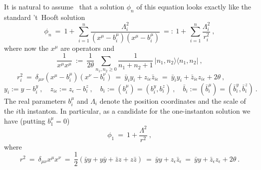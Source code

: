 \documentclass[a4paper,11pt]{article}
\numberwithin{equation}{section}
\def\de{\delta}
\def\eps{\epsilon}
\def\th{\theta}
\def\sfrac#1#2{{\textstyle\frac{#1}{#2}}}
\def\>{\rangle}
\def\<{\langle}
\begin{document}
{It is natural to assume~\cite{Nekrasov:1998ss} that a solution $\phi_n$ of 
this equation looks exactly like the standard 't~Hooft solution 
\begin{equation}\label{phin}
\phi_n\ =\ 1 +\,\sum^n_{i=1}\frac{\Lambda^2_i}{(x^\mu-b_i^\mu)(x^\mu-b_i^\mu)}\
=:\ 1+\,\sum_{i=1}^n\frac{\Lambda^2_i}{r^2_i}\ ,
\end{equation}
where now the $x^\mu$ are operators and
$$
\frac{1}{ x^\mu x^\mu}\ :=\ \frac{1}{2\theta}\sum_{{n_1},{n_2}\ge 0}
\frac{1}{n_1{+}n_2{+}1}\,|n_1,n_2\>\<n_1,n_2|\ ,
$$
$$
r_i^2\ =\ \de_{\mu\nu}(x^\mu -b_i^\mu )(x^\nu -b_i^\nu )\
=\ \bar y_iy_i+z_{i\eps}\bar z_{i\eps}\
=\ \bar y_iy_i+\bar z_{i\eps}z_{i\eps}+ 2\th\ ,
\phantom{XXX}
$$
\begin{equation}
y_i:=y-b_i^y\ ,\quad z_{i\eps}:=z_\eps-b^z_i\ ,\quad 
b_i:=(b_i^\mu)=(b_i^y,b_i^z)\ , \quad 
\bar b_i:=(\bar b_i^\mu)=(\bar b_i^y, \bar b_i^z)\ .
\end{equation}
The real parameters $b_i^\mu$ and $\Lambda_i$ denote the position coordinates 
and the scale of the $i$th instanton.
In particular, as a candidate for the one-instanton solution we have 
(putting $b_1^\mu{=}0$)
\begin{equation}\label{phi1}
\phi_1\ =\ 1+\frac{\Lambda^2}{r^2} \ ,
\end{equation}
where 
\begin{equation} \label{ncr}
r^2\ =\ \de_{\mu\nu}x^\mu x^\nu\ =\ 
\sfrac{1}{2}(\bar yy+y\bar y+\bar zz+z\bar z)\ =\ 
\bar yy + z_\eps\bar z_\eps\ =\
\bar yy + \bar z_\eps z_\eps + 2\th\ .
\end{equation}

}
\end{document}
